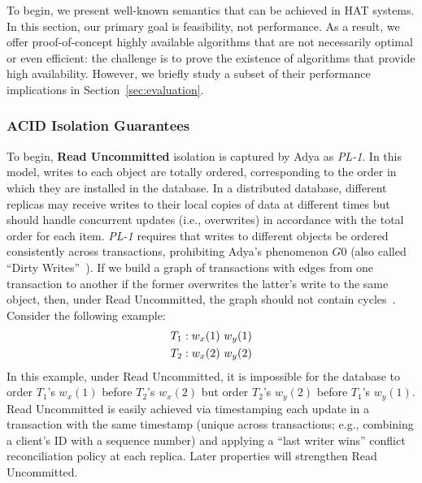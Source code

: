 To begin, we present well-known semantics that can be achieved in HAT
systems. In this section, our primary goal is feasibility, not
performance. As a result, we offer proof-of-concept highly available
algorithms that are not necessarily optimal or even efficient: the
challenge is to prove the existence of algorithms that provide high
availability. However, we briefly study a subset of their performance
implications in Section~\ref{sec:evaluation}.

\subsubsection{ACID Isolation Guarantees}
\label{sec:isolation}

To begin, \textbf{Read Uncommitted} isolation is captured by Adya as
\textit{PL-1}. In this model, writes to each object are totally
ordered, corresponding to the order in which they are installed in the
database. In a distributed database, different replicas may receive
writes to their local copies of data at different times but should
handle concurrent updates (i.e., overwrites) in accordance with the
total order for each item. \textit{PL-1} requires that writes to
different objects be ordered consistently across transactions,
prohibiting Adya's phenomenon $G0$ (also called ``Dirty
Writes''~\cite{ansicritique}). If we build a graph of transactions
with edges from one transaction to another if the former overwrites
the latter's write to the same object, then, under Read Uncommitted,
the graph should not contain cycles~\cite{adya}. Consider the
following example:
\begin{align*}
\small\vspace{-1em}
T_1 &: w_x(1)~w_y(1)
\\T_2 &: w_x(2)~w_y(2)
\end{align*}
In this example, under Read Uncommitted, it is impossible for the
database to order $T_1$'s $w_x(1)$ before $T_2$'s $w_x(2)$ but order
$T_2$'s $w_y(2)$ before $T_1$'s $w_y(1)$. Read Uncommitted is easily
achieved via timestamping each update in a transaction with the same
timestamp (unique across transactions; e.g., combining a client's ID
with a sequence number) and applying a ``last writer wins'' conflict
reconciliation policy at each replica. Later properties will
strengthen Read Uncommitted.


